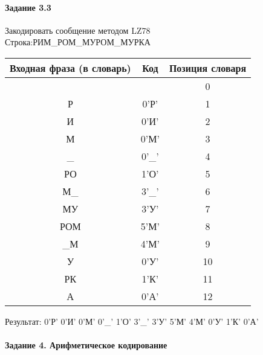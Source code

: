 \documentclass[a4paper, 12pt]{article}
\begin{document}
\paragraph{Задание 3.3}

Закодировать сообщение методом LZ78\\
Строка:РИМ\_РОМ\_МУРОМ\_МУРКА\\
\begin{table}[h!]
\centering
\begin{tabular}{|c|c|c|} 
\hline
 Входная фраза (в словарь) & Код & Позиция словаря \\ \hline

 &  & 0 \\ \hline
Р & 0'Р' & 1 \\ \hline
И & 0'И' & 2 \\ \hline
М & 0'М' & 3 \\ \hline
\_ & 0'\_' & 4 \\ \hline
РО & 1'О' & 5 \\ \hline
М\_ & 3'\_' & 6 \\ \hline
МУ & 3'У' & 7 \\ \hline
РОМ & 5'М' & 8 \\ \hline
\_М & 4'М' & 9 \\ \hline
У & 0'У' & 10 \\ \hline
РК & 1'К' & 11 \\ \hline
А & 0'А' & 12 \\ \hline
\end{tabular}
\end{table}

Результат: 0'Р' 0'И' 0'М' 0'\_' 1'О' 3'\_' 3'У' 5'М' 4'М' 0'У' 1'К' 0'А'\\
\pagebreak
\paragraph{Задание 4. Арифметическое кодирование\\}
\end{document}

